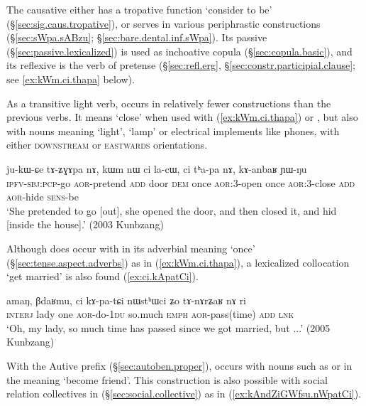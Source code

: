 The causative  either has a tropative function `consider to be' (§\ref{sec:sig.caus.tropative}), or serves in various periphrastic constructions (§\ref{sec:sWpa.sABzu}; §\ref{sec:bare.dental.inf.sWpa}). Its passive  (§\ref{sec:passive.lexicalized}) is used as inchoative copula (§\ref{sec:copula.basic}), and its reflexive is the verb of pretense  (§\ref{sec:refl.erg}, §\ref{sec:constr.participial.clause}; see \ref{ex:kWm.ci.thapa} below).

As a transitive light verb,  occurs in relatively fewer constructions than the previous verbs. It means `close' when used with  (\ref{ex:kWm.ci.thapa}) or , but also with nouns meaning `light', `lamp' or electrical implements like phones, with either \textsc{downstream} or \textsc{eastwards} orientations.

\begin{exe}
\ex \label{ex:kWm.ci.thapa}
\gll ju-kɯ-ɕe tɤ-ʑɣɤpa nɤ, kɯm nɯ ci la-cɯ, ci tʰa-pa nɤ, kɤ-anbaʁ ɲɯ-ŋu \\
\textsc{ipfv}-\textsc{sbj}:\textsc{pcp}-go \textsc{aor}-pretend \textsc{add} door \textsc{dem} once \textsc{aor}:3\flobv{}-open once \textsc{aor}:3\flobv{}-close \textsc{add} \textsc{aor}-hide \textsc{sens}-be \\
\glt `She pretended to go [out], she opened the door, and then closed it, and hid [inside the house].' (2003 Kunbzang)
\end{exe}

Although  does occur with  in its adverbial meaning `once' (§\ref{sec:tense.aspect.adverbs}) as in (\ref{ex:kWm.ci.thapa}), a lexicalized collocation  `get married' is also found (\ref{ex:ci.kApatCi}).

\begin{exe}
\ex \label{ex:ci.kApatCi}
\gll amaŋ, βdaʁmu, ci kɤ-pa-tɕi nɯstʰɯci ʑo tɤ-nɤrʑaʁ nɤ ri \\
\textsc{interj} lady one \textsc{aor}-do-\textsc{1du} so.much \textsc{emph} \textsc{aor}-pass(time) \textsc{add} \textsc{lnk} \\
\glt `Oh, my lady, so much time has passed since we got married, but ...' (2005 Kunbzang)
\end{exe}

With the Autive prefix (§\ref{sec:autoben.proper}),  occurs with nouns such as  or  in the meaning `become friend'. This construction is also possible with social relation collectives in  (§\ref{sec:social.collective}) as in (\ref{ex:kAndZiGWfsu.nWpatCi}).

